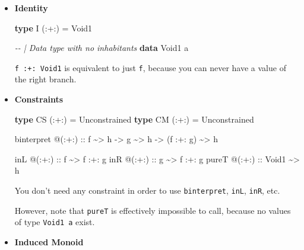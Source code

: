 \documentclass[]{article}
\newenvironment{Shaded}{}{}
\newcommand{\CommentTok}[1]{\textcolor[rgb]{0.38,0.63,0.69}{\textit{#1}}}
\newcommand{\DataTypeTok}[1]{\textcolor[rgb]{0.56,0.13,0.00}{#1}}
\newcommand{\KeywordTok}[1]{\textcolor[rgb]{0.00,0.44,0.13}{\textbf{#1}}}
\newcommand{\NormalTok}[1]{#1}
\newcommand{\OperatorTok}[1]{\textcolor[rgb]{0.40,0.40,0.40}{#1}}
\newcommand{\OtherTok}[1]{\textcolor[rgb]{0.00,0.44,0.13}{#1}}
\renewcommand{\href}[2]{#2\footnote{\url{#1}}}
\begin{document}
\begin{itemize}
  \texttt{binterpret} becomes analogous to \texttt{either} from
  \emph{\href{https://hackage.haskell.org/package/base/docs/Data-Either.html}{Data.Either}}
\item
  \textbf{Identity}

\begin{Shaded}
\begin{Highlighting}[]
\KeywordTok{type} \DataTypeTok{I}\NormalTok{ (}\OperatorTok{:+:}\NormalTok{) }\OtherTok{=} \DataTypeTok{Void1}

\CommentTok{{-}{-} | Data type with no inhabitants}
\KeywordTok{data} \DataTypeTok{Void1}\NormalTok{ a}
\end{Highlighting}
\end{Shaded}

  \texttt{f\ :+:\ Void1} is equivalent to just \texttt{f}, because you can never
  have a value of the right branch.
\item
  \textbf{Constraints}

\begin{Shaded}
\begin{Highlighting}[]
\KeywordTok{type} \DataTypeTok{CS}\NormalTok{ (}\OperatorTok{:+:}\NormalTok{) }\OtherTok{=} \DataTypeTok{Unconstrained}
\KeywordTok{type} \DataTypeTok{CM}\NormalTok{ (}\OperatorTok{:+:}\NormalTok{) }\OtherTok{=} \DataTypeTok{Unconstrained}

\NormalTok{binterpret }\OperatorTok{@}\NormalTok{(}\OperatorTok{:+:}\NormalTok{)}
\OtherTok{    ::}\NormalTok{ f }\OperatorTok{\textasciitilde{}>}\NormalTok{ h}
    \OtherTok{{-}>}\NormalTok{ g }\OperatorTok{\textasciitilde{}>}\NormalTok{ h}
    \OtherTok{{-}>}\NormalTok{ (f }\OperatorTok{:+:}\NormalTok{ g) }\OperatorTok{\textasciitilde{}>}\NormalTok{ h}

\NormalTok{inL   }\OperatorTok{@}\OtherTok{(:+:) ::}\NormalTok{ f     }\OperatorTok{\textasciitilde{}>}\NormalTok{ f }\OperatorTok{:+:}\NormalTok{ g}
\NormalTok{inR   }\OperatorTok{@}\OtherTok{(:+:) ::}\NormalTok{ g     }\OperatorTok{\textasciitilde{}>}\NormalTok{ f }\OperatorTok{:+:}\NormalTok{ g}
\NormalTok{pureT }\OperatorTok{@}\OtherTok{(:+:) ::} \DataTypeTok{Void1} \OperatorTok{\textasciitilde{}>}\NormalTok{ h}
\end{Highlighting}
\end{Shaded}

  You don't need any constraint in order to use \texttt{binterpret},
  \texttt{inL}, \texttt{inR}, etc.

  However, note that \texttt{pureT} is effectively impossible to call, because
  no values of type \texttt{Void1\ a} exist.
\item
  \textbf{Induced Monoid}


\end{itemize}
\end{document}
